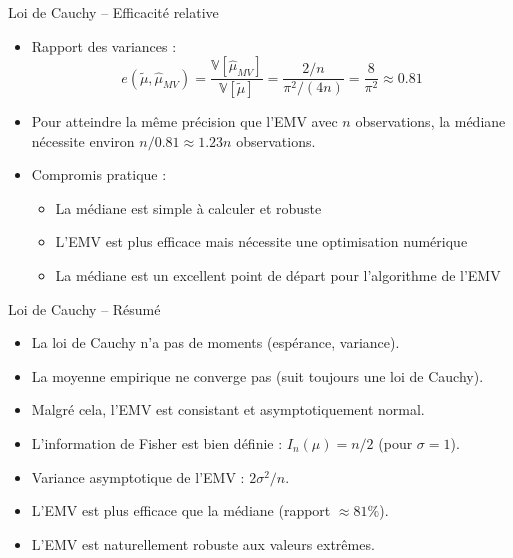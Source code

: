 \documentclass[11pt,aspectratio=169]{beamer}
\begin{document}
\begin{frame}{Loi de Cauchy -- Efficacité relative}

\begin{itemize}

\item Rapport des variances :
  \[
  e(\tilde{\mu}, \hat{\mu}_{MV}) = \frac{\mathbb{V}[\hat{\mu}_{MV}]}{\mathbb{V}[\tilde{\mu}]} = \frac{2/n}{\pi^2/(4n)} = \frac{8}{\pi^2} \approx 0.81
  \]

\item Pour atteindre la même précision que l'EMV avec $n$ observations, la médiane nécessite environ $n/0.81 \approx 1.23n$ observations.\newline

\item Compromis pratique :\newline
  \begin{itemize}
    \item La médiane est simple à calculer et robuste\newline
    \item L'EMV est plus efficace mais nécessite une optimisation numérique\newline
    \item La médiane est un excellent point de départ pour l'algorithme de l'EMV
  \end{itemize}

\end{itemize}

\end{frame}

\begin{frame}{Loi de Cauchy -- Résumé}

\begin{itemize}

\item La loi de Cauchy n'a pas de moments (espérance, variance).\newline

\item La moyenne empirique ne converge pas (suit toujours une loi de Cauchy).\newline

\item Malgré cela, l'EMV est consistant et asymptotiquement normal.\newline

\item L'information de Fisher est bien définie : $I_n(\mu) = n/2$ (pour $\sigma = 1$).\newline
\item Variance asymptotique de l'EMV : $2\sigma^2/n$.\newline

\item L'EMV est plus efficace que la médiane (rapport $\approx 81\%$).\newline

\item L'EMV est naturellement robuste aux valeurs extrêmes.

\end{itemize}

\end{frame}
\end{document}
